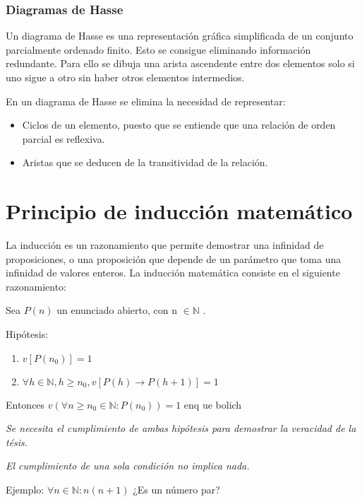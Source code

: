 \documentclass[a4paper, twoside]{article}
\begin{document}
	\subsubsection{Diagramas de Hasse}
	Un diagrama de Hasse es una representación gráfica simplificada de un conjunto parcialmente ordenado finito. 
	Esto se consigue eliminando información redundante. Para ello se dibuja una arista ascendente entre dos elementos solo si uno sigue a otro sin haber otros elementos intermedios.
	
	En un diagrama de Hasse se elimina la necesidad de representar:
	\begin{itemize}
		\item Ciclos de un elemento, puesto que se entiende que una relación de orden parcial es reflexiva.
		\item Aristas que se deducen de la transitividad de la relación.
	\end{itemize}	

\newpage
\section{Principio de inducción matemático}
	La inducción es un razonamiento que permite demostrar una infinidad de proposiciones, o una proposición que depende de un parámetro  que toma una infinidad de valores enteros. 
	La inducción matemática consiste en el siguiente razonamiento:
	
	\vspace{0.25cm}
	Sea $P(n)$ un enunciado abierto, con n $\in \mathbb{N}$ .
	\vspace{0.25cm}
	
	Hipótesis:
	\begin{enumerate}
		\item $v[P(n_{0})] = 1 $
		\item $ \forall h \in \mathbb{N} , h \geqslant n_{0} , v[P(h) \rightarrow P(h+1)] = 1$
	\end{enumerate}	 
	\vspace{0.25cm}
	Entonces $v(\forall n  \geqslant n_{0} \in \mathbb{N} : P(n_{0})) = 1 $
	\vspace{0.25cm}enq ue bolich
	
	\emph{Se necesita el cumplimiento de ambas hipótesis para demostrar la veracidad de la tésis.}
		
	\emph{El cumplimiento de una sola condición no implica nada.}
	
	\vspace{0.25cm}
	Ejemplo: $\forall n \in \mathbb{N}: n(n+1)$ ¿Es un número par?
	\vspace{0.25cm}
	
\end{document}
